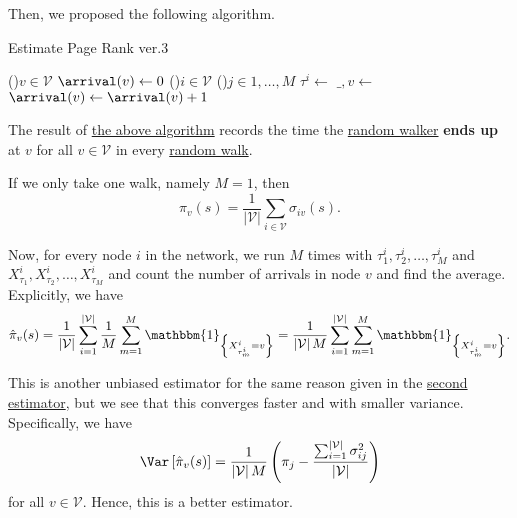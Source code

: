 Then, we proposed the following algorithm.

\begin{algorithm}[H]\label{algo:Monte-Carlo-algorithm-3}
	\DontPrintSemicolon
	\caption{Estimate Page Rank ver.3}

	\BlankLine

	\For(){\(v\in \mathcal{V} \)}{
		\(\arrival(v)\gets 0\)\;
	}
	\;
	\For(){\(i\in \mathcal{V}\)}{
		\For(){\(j\in 1, \dots, M\)}{
			\(\tau^i \gets \) 
			\(\_, v \gets\)
			\(\arrival(v)\gets \arrival(v) + 1\)
		}
	}
	\Return{\arrival}\;
\end{algorithm}
\begin{note}
	The result of \hyperref[algo:Monte-Carlo-algorithm-3]{the above algorithm} records the time the \hyperref[def:random-walker]{random walker}
	\textbf{ends up} at \(v\) for all \(v\in \mathcal{V} \) in every \hyperref[algo:random-walk-algorithm]{random walk}.
\end{note}

If we only take one walk, namely \(M = 1\), then
\[
	\pi_v(s) = \frac{1}{\left\vert \mathcal{V}  \right\vert }\sum\limits_{i\in\mathcal{V}}\sigma_{iv}(s).
\]

Now, for every node \(i\) in the network, we run \(M\) times with \(\tau^i_1, \tau^i_2, \dots , \tau^i_M\) and \(X_{\tau_1}^i, X_{\tau_2}^i, \dots , X_{\tau_M}^i\) and count the number of arrivals in node \(v\) and find the average. Explicitly, we have
\[
	\hat{\pi}_v(s)
	= \frac{1}{\left\vert \mathcal{V} \right\vert}\sum\limits_{i=1}^{\left\vert \mathcal{V}\right\vert} \frac{1}{M}\sum\limits_{m=1}^{M} \mathbbm{1}_{\left\{X^i_{\tau^i_m} = v\right\}}
	= \frac{1}{\left\vert \mathcal{V}  \right\vert M}\sum\limits_{i=1}^{\left\vert \mathcal{V} \right\vert} \sum\limits_{m=1}^{M} \mathbbm{1}_{\left\{X^i_{\tau^i_m} = v\right\}}.
\]

This is another unbiased estimator for the same reason given in the \hyperref[subsec:second-page-rank-estimator]{second estimator}, but we see that this converges faster and with smaller variance. Specifically, we have
\[
	\Var\left[\hat{\pi}_v(s) \right]  = \frac{1}{\left\vert \mathcal{V}  \right\vert M}\left(\pi_{j} - \frac{\sum_{i=1}^{\left\vert \mathcal{V}  \right\vert} \sigma_{ij}^2}{\left\vert \mathcal{V}  \right\vert}\right)
\]
for all \(v\in \mathcal{V} \). Hence, this is a better estimator.

